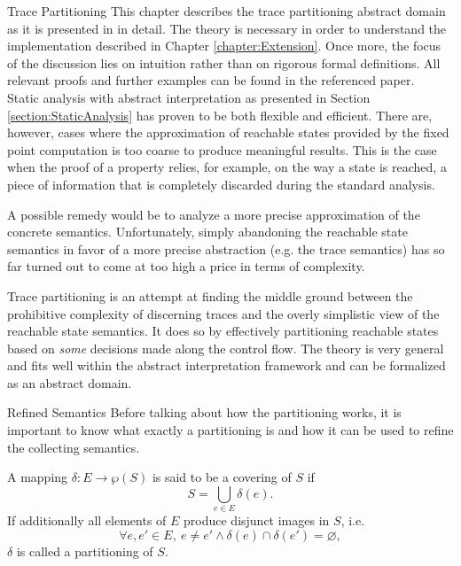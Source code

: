 \begin{chapter}{Trace Partitioning}
	\label{chapter:TracePartitioning}
	This chapter describes the trace partitioning abstract domain as it is presented in \cite{mauborgne:rival07, mauborgne:rival05} in detail. The theory is necessary in order to understand the implementation described in Chapter \ref{chapter:Extension}. Once more, the focus of the discussion lies on intuition rather than on rigorous formal definitions. All relevant proofs and further examples can be found in the referenced paper.\\

	Static analysis with abstract interpretation as presented in Section \ref{section:StaticAnalysis} has proven to be both flexible and efficient. There are, however, cases where the approximation of reachable states provided by the fixed point computation is too coarse to produce meaningful results. This is the case when the proof of a property relies, for example, on the way a state is reached, a piece of information that is completely discarded during the standard analysis.

	A possible remedy would be to analyze a more precise approximation of the concrete semantics. Unfortunately, simply abandoning the reachable state semantics in favor of a more precise abstraction (e.g. the trace semantics) has so far turned out to come at too high a price in terms of complexity.

	Trace partitioning is an attempt at finding the middle ground between the prohibitive complexity of discerning traces and the overly simplistic view of the reachable state semantics. It does so by effectively partitioning reachable states based on \emph{some} decisions made along the control flow. The theory is very general and fits well within the abstract interpretation framework and can be formalized as an abstract domain.


	\begin{section}{Refined Semantics}
		Before talking about how the partitioning works, it is important to know what exactly a partitioning is and how it can be used to refine the collecting semantics.

		\begin{definition}
			\label{definition:coveringpartition}
			A mapping $\delta: E \to \wp(S)$ is said to be a covering of $S$ if
			\begin{equation}
				S = \bigcup_{e \in E} \delta(e).
			\end{equation}
			If additionally all elements of $E$ produce disjunct images in $S$, i.e.
			\begin{equation}
				\forall e, e' \in E, \ e \neq e' \land \delta(e) \cap \delta(e') = \varnothing,
			\end{equation}
			$\delta$ is called a partitioning of $S$.
		\end{definition}


\end{section}
\end{chapter}

